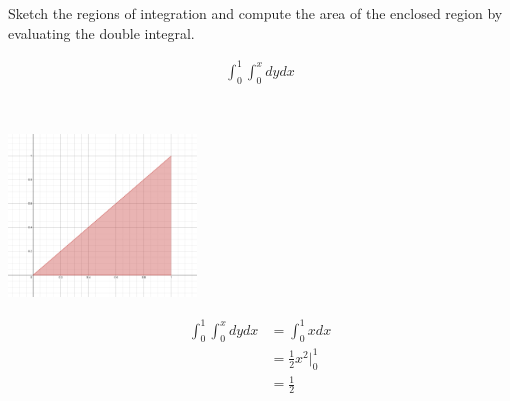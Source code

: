 Sketch the regions of integration and compute the area of the enclosed region by evaluating the
double integral.

\begin{align*}
    \int_{0}^{1} \int_{0}^{x} dy dx
\end{align*}

\begin{solution} \
    \begin{center}
        \includegraphics[width=0.375\textwidth]{img/e1p1.png}
    \end{center}
    
    \begin{align*}
        \int_{0}^{1} \int_{0}^{x} dy dx &= \int_{0}^{1} xdx \\
        &= \frac{1}{2}x^2 \bigg|_{0}^{1} \\
        &= \frac{1}{2}
    \end{align*}
\end{solution}